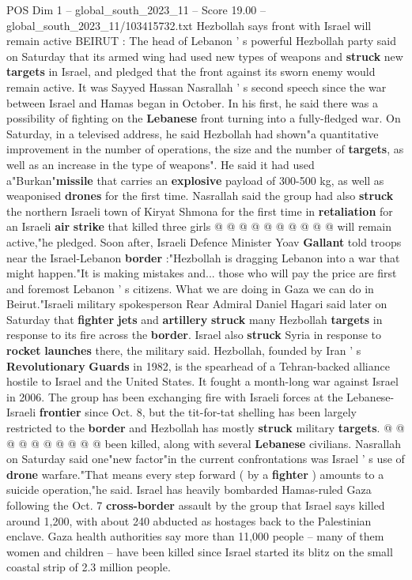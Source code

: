 \begin{textsample}{POS Dim 1 – global\_south\_2023\_11 – Score 19.00 – global\_south\_2023\_11/103415732.txt}  \label{ex:f1_pos_226}
Hezbollah says front with Israel will remain active BEIRUT : The head of Lebanon ' s powerful Hezbollah party said on Saturday that its armed wing had used new types of weapons and \textbf{struck} new \textbf{targets} in Israel, and pledged that the front against its sworn enemy would remain active.
It was Sayyed Hassan Nasrallah ' s second speech since the war between Israel and Hamas began in October.
In his first, he said there was a possibility of fighting on the \textbf{Lebanese} front turning into a fully-fledged war.
On Saturday, in a televised address, he said Hezbollah had shown"a quantitative improvement in the number of operations, the size and the number of \textbf{targets}, as well as an increase in the type of weapons".
He said it had used a"Burkan"\textbf{missile} that carries an \textbf{explosive} payload of 300-500 kg, as well as weaponised \textbf{drones} for the first time.
Nasrallah said the group had also \textbf{struck} the northern Israeli town of Kiryat Shmona for the first time in \textbf{retaliation} for an Israeli \textbf{air} \textbf{strike} that killed three girls @ @ @ @ @ @ @ @ @ @ will remain active,"he pledged.
Soon after, Israeli Defence Minister Yoav \textbf{Gallant} told troops near the Israel-Lebanon \textbf{border} :"Hezbollah is dragging Lebanon into a war that might happen."It is making mistakes and... those who will pay the price are first and foremost Lebanon ' s citizens.
What we are doing in Gaza we can do in Beirut."Israeli military spokesperson Rear Admiral Daniel Hagari said later on Saturday that \textbf{fighter} \textbf{jets} and \textbf{artillery} \textbf{struck} many Hezbollah \textbf{targets} in response to its fire across the \textbf{border}.
Israel also \textbf{struck} Syria in response to \textbf{rocket} \textbf{launches} there, the military said.
Hezbollah, founded by Iran ' s \textbf{Revolutionary} \textbf{Guards} in 1982, is the spearhead of a Tehran-backed alliance hostile to Israel and the United States.
It fought a month-long war against Israel in 2006.
The group has been exchanging fire with Israeli forces at the Lebanese-Israeli \textbf{frontier} since Oct. 8, but the tit-for-tat shelling has been largely restricted to the \textbf{border} and Hezbollah has mostly \textbf{struck} military \textbf{targets}. @ @ @ @ @ @ @ @ @ @ been killed, along with several \textbf{Lebanese} civilians.
Nasrallah on Saturday said one"new factor"in the current confrontations was Israel ' s use of \textbf{drone} warfare."That means every step forward ( by a \textbf{fighter} ) amounts to a suicide operation,"he said.
Israel has heavily bombarded Hamas-ruled Gaza following the Oct. 7 \textbf{cross-border} assault by the group that Israel says killed around 1,200, with about 240 abducted as hostages back to the Palestinian enclave.
Gaza health authorities say more than 11,000 people -- many of them women and children -- have been killed since Israel started its blitz on the small coastal strip of 2.3 million people.

\end{textsample}

